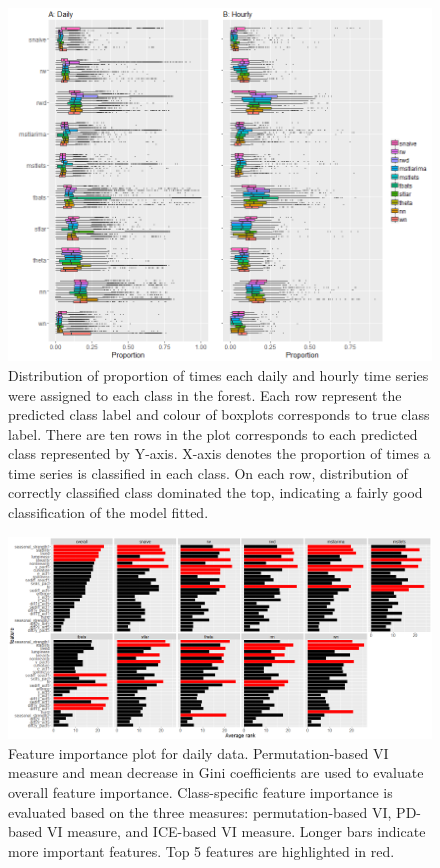 \documentclass[11pt,a4paper,]{article}
\begin{document}
\begin{figure}
\centering
\includegraphics{figures/oobdailyhourly-1.png}
\caption{\label{fig:oobdailyhourly}Distribution of proportion of times each
daily and hourly time series were assigned to each class in the forest.
Each row represent the predicted class label and colour of boxplots
corresponds to true class label. There are ten rows in the plot
corresponds to each predicted class represented by Y-axis. X-axis
denotes the proportion of times a time series is classified in each
class. On each row, distribution of correctly classified class dominated
the top, indicating a fairly good classification of the model fitted.}
\end{figure}

\newpage

\begin{figure}[h]

{\centering \includegraphics{figures/vidaily-1} 

}

\caption{Feature importance plot for daily data. Permutation-based VI measure and mean decrease in Gini coefficients are used to evaluate overall feature importance. Class-specific feature importance is evaluated based on the three measures: permutation-based VI, PD-based VI measure, and ICE-based VI measure. Longer bars indicate more important features. Top 5 features are highlighted in red.}\label{fig:vidaily}
\end{figure}
\end{document}
